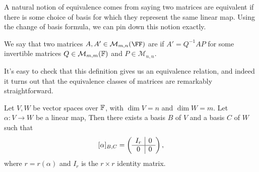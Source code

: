 \documentclass[a4paper]{scrartcl}
\begin{document}
A natural notion of equivalence comes from saying 
two matrices are equivalent if there is some choice of basis for which they represent the same linear map. Using the change of basis formula, we can pin down this notion exactly.

\begin{definition}
    We say that two matrices $A, A' \in \mathcal{M}_{m, n}(\FF)$ are  if $A' = Q^{-1}AP$ for some invertible matrices $Q \in \mathcal{M}_{m, m}(\mathbb{F})$ and $P \in \mathcal{M}_{n, n}$.    
\end{definition}

It's easy to check that this definition gives us an equivalence relation, and indeed it turns out that the equivalence classes of matrices are remarkably straightforward.

\begin{proposition}
    Let $V, W$ be vector spaces over $\mathbb{F}$, with $\dim V = n$ and $\dim W = m$. Let $\alpha: V \rightarrow W$ be a linear map, Then there exists a basis $B$ of $V$ and a basis $C$ of $W$ such that
    $$
    [\alpha]_{B, C} = \left(\begin{array}{ c | c }
        I_r & 0 \\
        \hline
        0 & 0
      \end{array}\right),
    $$
    where $r = r(\alpha)$ and $I_r$ is the $r \times r$ identity matrix.
\end{proposition}
\end{document}
